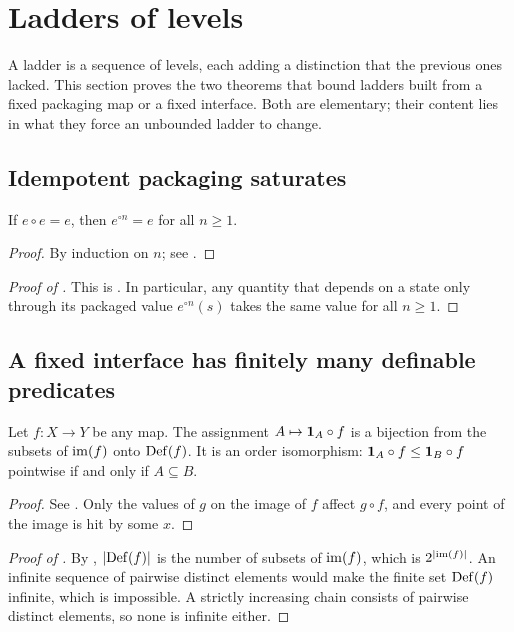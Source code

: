 \section{Ladders of levels}\label{sec:bounded-interface}

A ladder is a sequence of levels, each adding a distinction that the previous ones lacked.
This section proves the two theorems that bound ladders built from a fixed packaging map or a fixed interface.
Both are elementary; their content lies in what they force an unbounded ladder to change.

\subsection{Idempotent packaging saturates}

\begin{lemma}\label{lem:idempotent-iterates}
If $e\circ e=e$, then $e^{\circ n}=e$ for all $n\ge 1$.
\end{lemma}

\begin{proof}
By induction on $n$; see .
\end{proof}

\begin{proof}[Proof of ]
This is .
In particular, any quantity that depends on a state only through its packaged value $e^{\circ n}(s)$ takes the same value for all $n\ge 1$.
\end{proof}

\subsection{A fixed interface has finitely many definable predicates}

\begin{lemma}\label{lem:definability-bijection}
Let $f:X\to Y$ be any map. The assignment $A\mapsto\mathbf{1}_A\circ f$ is a bijection from the subsets of $\mathrm{im}(f)$ onto $\mathrm{Def}(f)$. It is an order isomorphism: $\mathbf{1}_A\circ f\le\mathbf{1}_B\circ f$ pointwise if and only if $A\subseteq B$.
\end{lemma}

\begin{proof}
See . Only the values of $g$ on the image of $f$ affect $g\circ f$, and every point of the image is hit by some $x$.
\end{proof}

\begin{proof}[Proof of ]
By , $|\mathrm{Def}(f)|$ is the number of subsets of $\mathrm{im}(f)$, which is $2^{|\mathrm{im}(f)|}$.
An infinite sequence of pairwise distinct elements would make the finite set $\mathrm{Def}(f)$ infinite, which is impossible.
A strictly increasing chain consists of pairwise distinct elements, so none is infinite either.
\end{proof}

